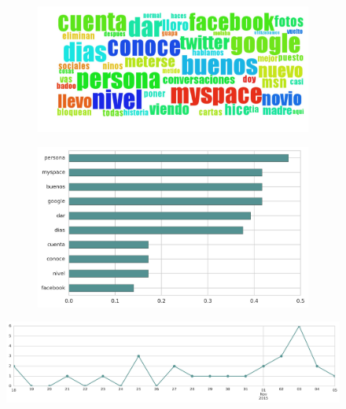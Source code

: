 \begin{figure}[htbp!]
    \centering
    \begin{subfigure}[b]{0.49\textwidth}
        \includegraphics[width=\textwidth]{twitter_murcia/report_images/topic-06-wordcloud.jpg}
    \end{subfigure}
    \begin{subfigure}[b]{0.49\textwidth}
        \includegraphics[width=\textwidth]{twitter_murcia/report_images/topic-06-terms.jpg}
    \end{subfigure}
\end{figure}

\begin{figure}[htbp!]
    \centering
    \includegraphics[width=\textwidth]{twitter_murcia/report_images/topic-06-timeseries.jpg}
\end{figure}

